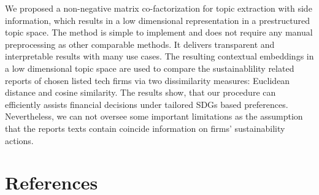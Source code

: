 \documentclass[
]{article}
\begin{document}
We proposed a non-negative matrix co-factorization for topic extraction with side information, which results in a low dimensional representation in a prestructured topic space. The method is simple to implement and does not require any manual preprocessing as other comparable methods. It delivers transparent and interpretable results with many use cases. The resulting contextual embeddings in a low dimensional topic space are used to compare the sustainablility related reports of chosen listed tech firms via two dissimilarity measures: Euclidean distance and cosine similarity. The results show, that our procedure can efficiently assists financial decisions under tailored SDGs based preferences.
Nevertheless, we can not oversee some important limitations as the assumption that the reports texts contain coincide information on firms' sustainability actions.

\hypertarget{references}{%
\section*{References}\label{references}}
\end{document}
